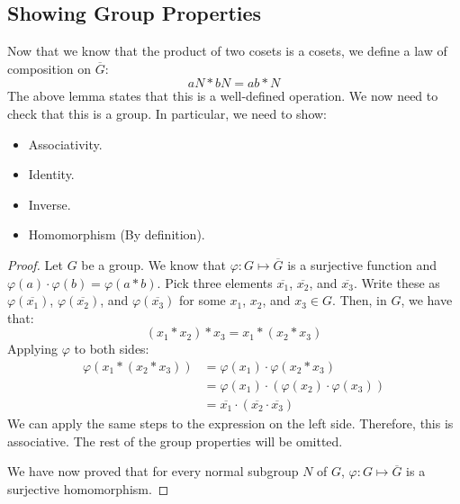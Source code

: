 \documentclass[letterpaper]{article}
\begin{document}
\subsection{Showing Group Properties}
Now that we know that the product of two cosets is a cosets, we define a law of composition on $\overline{G}$: 
\[aN * bN = ab * N\]
The above lemma states that this is a well-defined operation. We now need to check that this is a group. In particular, we need to show: 
\begin{itemize}
    \item Associativity.
    \item Identity. 
    \item Inverse. 
    \item Homomorphism (By definition).
\end{itemize}
\begin{mdframed}
    \begin{proof}
        Let $G$ be a group. We know that $\varphi: G \mapsto \overline{G}$ is a surjective function and $\varphi(a) \cdot \varphi(b) = \varphi(a * b)$. Pick three elements $\overline{x_1}$, $\overline{x_2}$, and $\overline{x_3}$. Write these as $\varphi(\overline{x_1})$, $\varphi(\overline{x_2})$, and $\varphi(\overline{x_3})$ for some $x_1$, $x_2$, and $x_3 \in G$. Then, in $G$, we have that: 
        \[(x_1 * x_2) * x_3 = x_1 * (x_2 * x_3)\]
        Applying $\varphi$ to both sides: 
        \begin{equation*}
            \begin{aligned}
                \varphi(x_1 * (x_2 * x_3)) &= \varphi(x_1) \cdot \varphi(x_2 * x_3) \\ 
                    &= \varphi(x_1) \cdot (\varphi(x_2) \cdot \varphi(x_3)) \\ 
                    &= \overline{x_1} \cdot (\overline{x_2} \cdot \overline{x_3})
            \end{aligned}
        \end{equation*}
        We can apply the same steps to the expression on the left side. Therefore, this is associative. The rest of the group properties will be omitted. 

        \bigskip 

        We have now proved that for every normal subgroup $N$ of $G$, $\varphi: G \mapsto \overline{G}$ is a surjective homomorphism. 
    \end{proof}
\end{mdframed}
\end{document}
